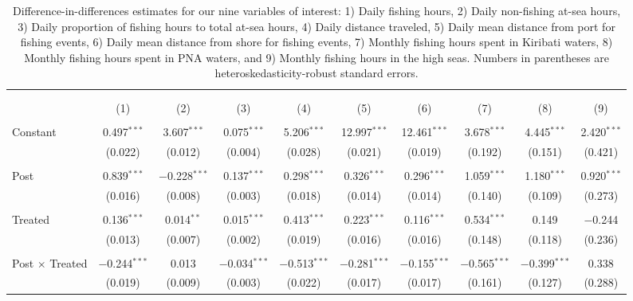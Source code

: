 
\begin{table}[!htbp] \centering 
  \caption{\label{tab:main_DID}Difference-in-differences estimates for our nine variables of interest: 1) Daily fishing hours, 2) Daily non-fishing at-sea hours, 3) Daily proportion of fishing hours to total at-sea hours, 4) Daily distance traveled, 5) Daily mean distance from port for fishing events, 6) Daily mean distance from shore for fishing events, 7) Monthly fishing hours spent in Kiribati waters, 8) Monthly fishing hours spent in PNA waters, and 9) Monthly fishing hours in the high seas. Numbers in parentheses are heteroskedasticity-robust standard errors.} 
  \label{} 
\footnotesize 
\begin{tabular}{@{\extracolsep{1pt}}lccccccccc} 
\\[-1.8ex]\hline 
\hline \\[-1.8ex] 
\\[-1.8ex] & (1) & (2) & (3) & (4) & (5) & (6) & (7) & (8) & (9)\\ 
\hline \\[-1.8ex] 
 Constant & 0.497$^{***}$ & 3.607$^{***}$ & 0.075$^{***}$ & 5.206$^{***}$ & 12.997$^{***}$ & 12.461$^{***}$ & 3.678$^{***}$ & 4.445$^{***}$ & 2.420$^{***}$ \\ 
  & (0.022) & (0.012) & (0.004) & (0.028) & (0.021) & (0.019) & (0.192) & (0.151) & (0.421) \\ 
  & & & & & & & & & \\ 
 Post & 0.839$^{***}$ & $-$0.228$^{***}$ & 0.137$^{***}$ & 0.298$^{***}$ & 0.326$^{***}$ & 0.296$^{***}$ & 1.059$^{***}$ & 1.180$^{***}$ & 0.920$^{***}$ \\ 
  & (0.016) & (0.008) & (0.003) & (0.018) & (0.014) & (0.014) & (0.140) & (0.109) & (0.273) \\ 
  & & & & & & & & & \\ 
 Treated & 0.136$^{***}$ & 0.014$^{**}$ & 0.015$^{***}$ & 0.413$^{***}$ & 0.223$^{***}$ & 0.116$^{***}$ & 0.534$^{***}$ & 0.149 & $-$0.244 \\ 
  & (0.013) & (0.007) & (0.002) & (0.019) & (0.016) & (0.016) & (0.148) & (0.118) & (0.236) \\ 
  & & & & & & & & & \\ 
 Post $\times$ Treated & $-$0.244$^{***}$ & 0.013 & $-$0.034$^{***}$ & $-$0.513$^{***}$ & $-$0.281$^{***}$ & $-$0.155$^{***}$ & $-$0.565$^{***}$ & $-$0.399$^{***}$ & 0.338 \\ 
  & (0.019) & (0.009) & (0.003) & (0.022) & (0.017) & (0.017) & (0.161) & (0.127) & (0.288) \\ 

\end{tabular}
\end{table}
